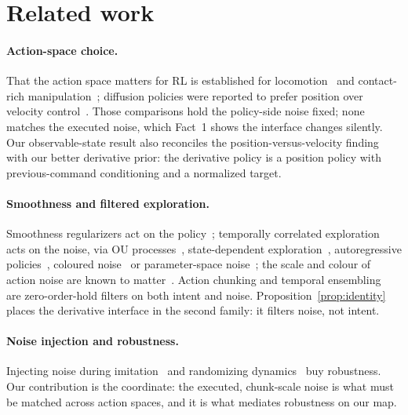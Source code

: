 \documentclass{article}
\begin{document}
\section{Related work}

\paragraph{Action-space choice.} That the action space matters for RL is established for locomotion~\citep{peng2017actionspace} and contact-rich manipulation~\citep{martinmartin2019variableimpedance}; diffusion policies were reported to prefer position over velocity control~\citep{chi2023diffusionpolicy}. Those comparisons hold the policy-side noise fixed; none matches the executed noise, which Fact~1 shows the interface changes silently. Our observable-state result also reconciles the position-versus-velocity finding with our better derivative prior: the derivative policy is a position policy with previous-command conditioning and a normalized target.

\paragraph{Smoothness and filtered exploration.} Smoothness regularizers act on the policy~\citep{mysore2021caps}; temporally correlated exploration acts on the noise, via OU processes~\citep{lillicrap2016ddpg}, state-dependent exploration~\citep{raffin2021smoothexplorationroboticreinforcement}, autoregressive policies~\citep{korenkevych2019autoregressive}, coloured noise~\citep{eberhard2023pink} or parameter-space noise~\citep{plappert2018parameternoise}; the scale and colour of action noise are known to matter~\citep{hollenstein2022actionnoise}. Action chunking and temporal ensembling~\citep{zhao2023act,li2026reinforcementlearningactionchunking} are zero-order-hold filters on both intent and noise. Proposition~\ref{prop:identity} places the derivative interface in the second family: it filters noise, not intent.

\paragraph{Noise injection and robustness.} Injecting noise during imitation~\citep{laskey2017dart} and randomizing dynamics~\citep{peng2018dynamicsrandomization} buy robustness. Our contribution is the coordinate: the executed, chunk-scale noise is what must be matched across action spaces, and it is what mediates robustness on our map.
\end{document}
